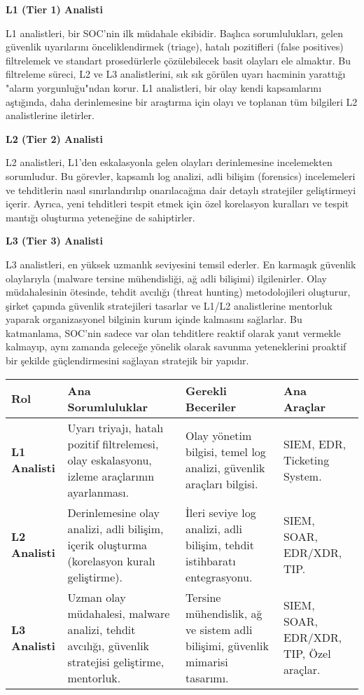 \textbf{L1 (Tier 1) Analisti}

L1 analistleri, bir SOC'nin ilk müdahale ekibidir. Başlıca sorumlulukları, gelen güvenlik uyarılarını önceliklendirmek (triage), hatalı pozitifleri (false positives) filtrelemek ve standart prosedürlerle çözülebilecek basit olayları ele almaktır. Bu filtreleme süreci, L2 ve L3 analistlerini, sık sık görülen uyarı hacminin yarattığı "alarm yorgunluğu"ndan korur. L1 analistleri, bir olay kendi kapsamlarını aştığında, daha derinlemesine bir araştırma için olayı ve toplanan tüm bilgileri L2 analistlerine iletirler.

\textbf{L2 (Tier 2) Analisti}

L2 analistleri, L1'den eskalasyonla gelen olayları derinlemesine incelemekten sorumludur. Bu görevler, kapsamlı log analizi, adli bilişim (forensics) incelemeleri ve tehditlerin nasıl sınırlandırılıp onarılacağına dair detaylı stratejiler geliştirmeyi içerir. Ayrıca, yeni tehditleri tespit etmek için özel korelasyon kuralları ve tespit mantığı oluşturma yeteneğine de sahiptirler.

\textbf{L3 (Tier 3) Analisti}

L3 analistleri, en yüksek uzmanlık seviyesini temsil ederler. En karmaşık güvenlik olaylarıyla (malware tersine mühendisliği, ağ adli bilişimi) ilgilenirler. Olay müdahalesinin ötesinde, tehdit avcılığı (threat hunting) metodolojileri oluşturur, şirket çapında güvenlik stratejileri tasarlar ve L1/L2 analistlerine mentorluk yaparak organizasyonel bilginin kurum içinde kalmasını sağlarlar. Bu katmanlama, SOC'nin sadece var olan tehditlere reaktif olarak yanıt vermekle kalmayıp, aynı zamanda geleceğe yönelik olarak savunma yeteneklerini proaktif bir şekilde güçlendirmesini sağlayan stratejik bir yapıdır.

\begin{longtable}{|p{3cm}|p{3cm}|p{3cm}|p{3cm}|}
\hline
\textbf{Rol} & \textbf{Ana Sorumluluklar} & \textbf{Gerekli Beceriler} & \textbf{Ana Araçlar} \\
\hline
\textbf{L1 Analisti} & Uyarı triyajı, hatalı pozitif filtrelemesi, olay eskalasyonu, izleme araçlarının ayarlanması. & Olay yönetim bilgisi, temel log analizi, güvenlik araçları bilgisi. & SIEM, EDR, Ticketing System. \\
\hline
\textbf{L2 Analisti} & Derinlemesine olay analizi, adli bilişim, içerik oluşturma (korelasyon kuralı geliştirme). & İleri seviye log analizi, adli bilişim, tehdit istihbaratı entegrasyonu. & SIEM, SOAR, EDR/XDR, TIP. \\
\hline
\textbf{L3 Analisti} & Uzman olay müdahalesi, malware analizi, tehdit avcılığı, güvenlik stratejisi geliştirme, mentorluk. & Tersine mühendislik, ağ ve sistem adli bilişimi, güvenlik mimarisi tasarımı. & SIEM, SOAR, EDR/XDR, TIP, Özel araçlar. \\
\hline
\end{longtable}


